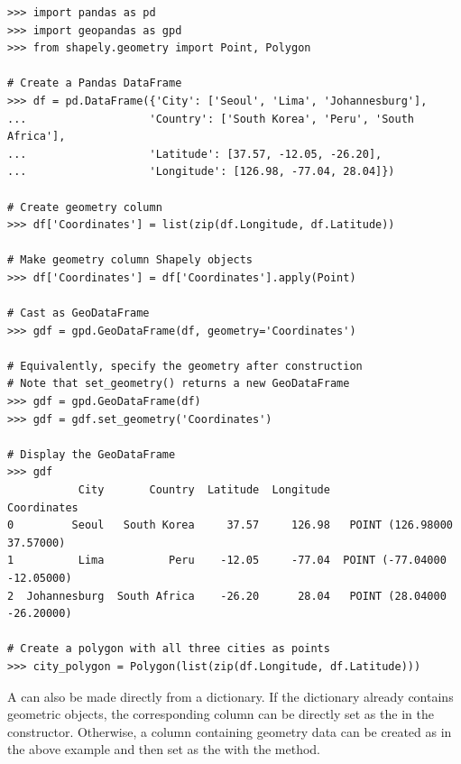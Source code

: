 \begin{lstlisting}
>>> import pandas as pd
>>> import geopandas as gpd
>>> from shapely.geometry import Point, Polygon

# Create a Pandas DataFrame
>>> df = pd.DataFrame({'City': ['Seoul', 'Lima', 'Johannesburg'],
...                   'Country': ['South Korea', 'Peru', 'South Africa'],
...                   'Latitude': [37.57, -12.05, -26.20],
...                   'Longitude': [126.98, -77.04, 28.04]})

# Create geometry column
>>> df['Coordinates'] = list(zip(df.Longitude, df.Latitude))

# Make geometry column Shapely objects
>>> df['Coordinates'] = df['Coordinates'].apply(Point)

# Cast as GeoDataFrame
>>> gdf = gpd.GeoDataFrame(df, geometry='Coordinates')

# Equivalently, specify the geometry after construction
# Note that set_geometry() returns a new GeoDataFrame
>>> gdf = gpd.GeoDataFrame(df)
>>> gdf = gdf.set_geometry('Coordinates')

# Display the GeoDataFrame
>>> gdf
           City       Country  Latitude  Longitude                  Coordinates
0         Seoul   South Korea     37.57     126.98   POINT (126.98000 37.57000)
1          Lima          Peru    -12.05     -77.04  POINT (-77.04000 -12.05000)
2  Johannesburg  South Africa    -26.20      28.04   POINT (28.04000 -26.20000)

# Create a polygon with all three cities as points
>>> city_polygon = Polygon(list(zip(df.Longitude, df.Latitude)))
\end{lstlisting}

A  can also be made directly from a dictionary.
If the dictionary already contains geometric objects, the corresponding column can be directly set as the  in the constructor.
Otherwise, a column containing geometry data can be created as in the above example and then set as the  with the  method.

